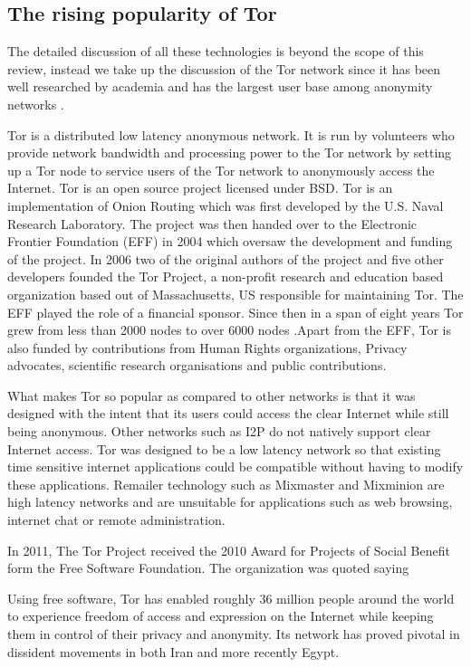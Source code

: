 \documentclass{llncs}
\begin{document}
\subsection{The rising popularity of Tor}
The detailed discussion of all these technologies is beyond the scope of this review, instead we take up the discussion of the Tor network since it has been well researched by academia and has the largest user base among anonymity networks \cite{tor-metrics}.

Tor is a distributed low latency anonymous network. It is run by volunteers who provide network bandwidth and processing power to the Tor network by setting up a Tor node to service users of the Tor network to anonymously access the Internet. Tor is an open source project licensed under BSD. Tor is an implementation of Onion Routing which was first developed by the U.S. Naval Research Laboratory. The project was then handed over to the Electronic Frontier Foundation (EFF) in 2004 which oversaw the development and funding of the project. In 2006 two of the original authors of the project and five other developers founded the Tor Project, a non-profit research and education based organization based out of Massachusetts, US responsible for maintaining Tor. The EFF played the role of a financial sponsor. Since then in a span of eight years Tor grew from less than 2000 nodes to over 6000 nodes \cite{tor-metrics}.Apart from the EFF, Tor is also funded by contributions from Human Rights organizations, Privacy advocates, scientific research organisations and public contributions.
 
What makes Tor so popular as compared to other networks is that it was designed with the intent that its users could access the clear Internet while still being anonymous. Other networks such as I2P do not natively support clear Internet access. Tor was designed to be a low latency network so that existing time sensitive internet applications could be compatible without having to modify these applications. Remailer technology such as Mixmaster and Mixminion are high latency networks and are unsuitable for applications such as web browsing, internet chat or remote administration.

In 2011, The Tor Project received the 2010 Award for Projects of Social Benefit form the Free Software Foundation. The organization was quoted saying
\begin{displayquote}
Using free software, Tor has enabled roughly 36 million people around the world to experience freedom of access and expression on the Internet while keeping them in control of their privacy and anonymity. Its network has proved pivotal in dissident movements in both Iran and more recently Egypt.\cite{free-software-foundation}
\end{displayquote}
\end{document}
